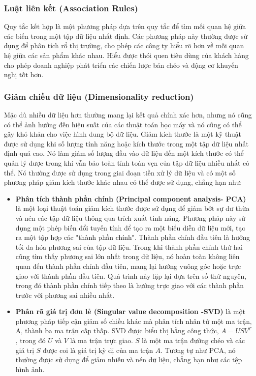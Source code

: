 \subsubsection{Luật liên kết (Association Rules)}
Quy tắc kết hợp là một phương pháp dựa trên quy tắc để tìm mối quan hệ giữa các biến trong một tập dữ liệu nhất định. Các phương pháp này thường được sử dụng để phân tích rổ thị trường, cho phép các công ty hiểu rõ hơn về mối quan hệ giữa các sản phẩm khác nhau. Hiểu được thói quen tiêu dùng của khách hàng cho phép doanh nghiệp phát triển các chiến lược bán chéo và động cơ khuyến nghị tốt hơn.
\subsubsection{Giảm chiều dữ liệu (Dimensionality reduction)}
Mặc dù nhiều dữ liệu hơn thường mang lại kết quả chính xác hơn, nhưng nó cũng có thể ảnh hưởng đến hiệu suất của các thuật toán học máy và nó cũng có thể gây khó khăn cho việc hình dung bộ dữ liệu. Giảm kích thước là một kỹ thuật được sử dụng khi số lượng tính năng hoặc kích thước trong một tập dữ liệu nhất định quá cao. Nó làm giảm số lượng đầu vào dữ liệu đến một kích thước có thể quản lý được trong khi vẫn bảo toàn tính toàn vẹn của tập dữ liệu nhiều nhất có thể. Nó thường được sử dụng trong giai đoạn tiền xử lý dữ liệu và có một số phương pháp giảm kích thước khác nhau có thể được sử dụng, chẳng hạn như:
\begin{itemize}
    \item \textbf{Phân tích thành phần chính (Principal component analysis- PCA)} là một loại thuật toán giảm kích thước được sử dụng để giảm bớt sự dư thừa và nén các tập dữ liệu thông qua trích xuất tính năng. Phương pháp này sử dụng một phép biến đổi tuyến tính để tạo ra một biểu diễn dữ liệu mới, tạo ra một tập hợp các "thành phần chính". Thành phần chính đầu tiên là hướng tối đa hóa phương sai của tập dữ liệu. Trong khi thành phần chính thứ hai cũng tìm thấy phương sai lớn nhất trong dữ liệu, nó hoàn toàn không liên quan đến thành phần chính đầu tiên, mang lại hướng vuông góc hoặc trực giao với thành phần đầu tiên. Quá trình này lặp lại dựa trên số thứ nguyên, trong đó thành phần chính tiếp theo là hướng trực giao với các thành phần trước với phương sai nhiều nhất.
    \item \textbf{Phân rã giá trị đơn lẻ (Singular value decomposition -SVD)} là một phương pháp tiếp cận giảm số chiều khác mà phân tích nhân tử một ma trận, A, thành ba ma trận cấp thấp. SVD được biểu thị bằng công thức, $A = USV^T$, trong đó $U$ và $V$ là ma trận trực giao. $S$ là một ma trận đường chéo và các giá trị $S$ được coi là giá trị kỳ dị của ma trận $A$. Tương tự như PCA, nó thường được sử dụng để giảm nhiễu và nén dữ liệu, chẳng hạn như các tệp hình ảnh.
\end{itemize}
